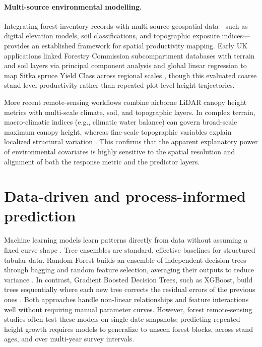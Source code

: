 \paragraph*{Multi-source environmental modelling.}
Integrating forest inventory records with multi-source geospatial data—such as digital elevation models, soil classifications, and topographic exposure indices—provides an established framework for spatial productivity mapping. Early UK applications linked Forestry Commission subcompartment databases with terrain and soil layers via principal component analysis and global linear regression to map Sitka spruce Yield Class across regional scales \citep{bateman1998Using_C1_SS}, though this evaluated coarse stand-level productivity rather than repeated plot-level height trajectories.

More recent remote-sensing workflows combine airborne LiDAR canopy height metrics with multi-scale climate, soil, and topographic layers. In complex terrain, macro-climatic indices (e.g., climatic water balance) can govern broad-scale maximum canopy height, whereas fine-scale topographic variables explain localized structural variation \citep{fricker2019More_C3_LID}. This confirms that the apparent explanatory power of environmental covariates is highly sensitive to the spatial resolution and alignment of both the response metric and the predictor layers.



\section{Data-driven and process-informed prediction}
\label{sec:background-prediction}

Machine learning models learn patterns directly from data without assuming a fixed curve shape \citep{lee2018Machine_C3_LID}. Tree ensembles are standard, effective baselines for structured tabular data. Random Forest builds an ensemble of independent decision trees through bagging and random feature selection, averaging their outputs to reduce variance \citep{breiman2001RandomForest_C4_NN}. In contrast, Gradient Boosted Decision Trees, such as XGBoost, build trees sequentially where each new tree corrects the residual errors of the previous ones \citep{chen2016XGBoost_C4_NN}. Both approaches handle non-linear relationships and feature interactions well without requiring manual parameter curves. However, forest remote-sensing studies often test these models on single-date snapshots; predicting repeated height growth requires models to generalize to unseen forest blocks, across stand ages, and over multi-year survey intervals.

